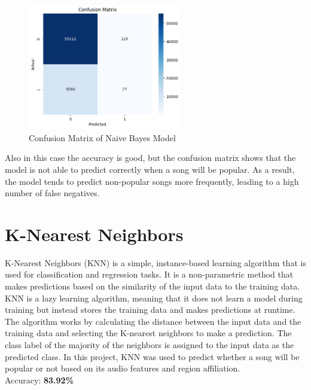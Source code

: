 \begin{figure}[h] 
    \centering 
    \includegraphics[width=0.6\textwidth]{media/naive_bayes_confusion_matrix.png}
    \caption{Confusion Matrix of Naive Bayes Model}

\end{figure}

Also in this case the accuracy is good, but the confusion matrix shows that the model is not able to predict correctly when a song will be popular. As a result, the model tends to predict non-popular songs more frequently, leading to a high number of false negatives.

\newpage


\section{K-Nearest Neighbors}

K-Nearest Neighbors (KNN) is a simple, instance-based learning algorithm that is used for classification and regression tasks. It is a non-parametric method that makes predictions based on the similarity of the input data to the training data. KNN is a lazy learning algorithm, meaning that it does not learn a model during training but instead stores the training data and makes predictions at runtime. The algorithm works by calculating the distance between the input data and the training data and selecting the K-nearest neighbors to make a prediction. The class label of the majority of the neighbors is assigned to the input data as the predicted class. In this project, KNN was used to predict whether a song will be popular or not based on its audio features and region affiliation. \\

Accuracy: \textbf{83.92\%}


